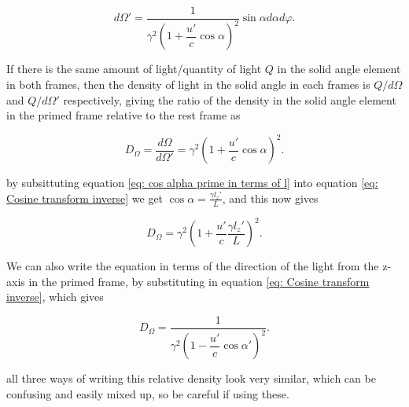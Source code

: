 \begin{equation}
		d\Omega{'} = \dfrac{1}{{\gamma}^2\left(1 + \dfrac{u'}{c}\cos{\alpha}\right)^2} \sin{\alpha} d\alpha d\varphi.
\end{equation}


If there is the same amount of light/quantity of light $Q$ in the solid angle element in both frames, then the density of light in the solid angle in each frames is $Q/d\Omega$ and $Q/d\Omega{'}$ respectively, giving the ratio of the density in the solid angle element in the primed frame relative to the rest frame as

\begin{equation}
	D_\Omega = \frac{d\Omega}{d\Omega'} = {\gamma}^2\left(1 + \dfrac{u'}{c}\cos{\alpha}\right)^2.
\end{equation}

by subsittuting equation \eqref{eq: cos alpha prime in terms of l} into equation \eqref{eq: Cosine transform inverse} we get $\cos\alpha=\frac{\gamma l_z'}{L}$, and this now gives

\begin{equation}
	D_\Omega = {\gamma}^2\left(1 + \dfrac{u'}{c}\frac{\gamma l_z'}{L}\right)^2.
\end{equation}

We can also write the equation in terms of the direction of the light from the z-axis in the primed frame, by substituting in equation \eqref{eq: Cosine transform inverse}, which gives

\begin{equation}
	\label{eq: aberrational wavefront weighting}
	D_\Omega = \frac{1}{{\gamma}^2\left(1 - \dfrac{u'}{c}\cos{\alpha'}\right)^2}.
\end{equation}

all three ways of writing this relative density look very similar, which can be confusing and easily mixed up, so be careful if using these.



